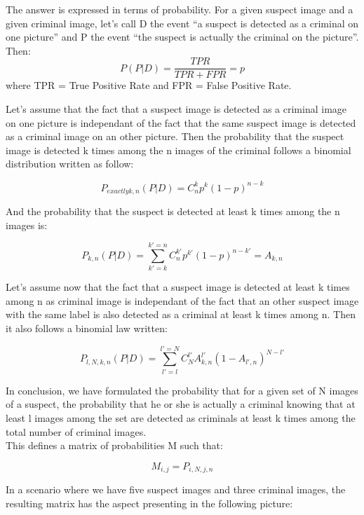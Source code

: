 The answer is expressed in terms of probability.
For a given suspect image and a given criminal image, let's call D the event \enquote{a suspect is detected as a criminal on one picture} and P the event \enquote{the suspect is actually the criminal on the picture}.
Then:\\
\[P(P|D)=\frac{TPR}{TPR+FPR}=p\]
where TPR = True Positive Rate and FPR = False Positive Rate.

Let's assume that the fact that a suspect image is detected as a criminal image on one picture is independant of the fact that the same suspect image is detected as a criminal image on an other picture. Then the probability that the suspect image is detected k times among the n images of the criminal follows a binomial distribution written as follow:

\[P_{exactly k,n}(P|D)=C^{k}_{n}p^k(1-p)^{n-k}\]

And the probability that the suspect is detected at least k times among the n images is:

\[P_{k,n}(P|D)=\sum_{k'=k}^{k'=n} C^{k'}_{n}p^{k'}(1-p)^{n-k'}=A_{k,n}\]

Let's assume now that the fact that a suspect image is detected at least k times among n as criminal image is independant of the fact that an other suspect image with the same label is also detected as a criminal at least k times among n. Then it also follows a binomial law written:

\[P_{l,N,k,n}(P|D)=\sum_{l'=l}^{l'=N} C^{l'}_{N}A_{k,n}^{l'}(1-A_{l',n})^{N-l'}\]

In conclusion, we have formulated the probability that for a given set of N images of a suspect, the probability that he or she is actually a criminal knowing that at least l images among the set are detected as criminals at least k times among the total number of criminal images.\\

This defines a matrix of probabilities M such that:

\[M_{i,j}=P_{i,N,j,n}\]

In a scenario where we have five suspect images and three criminal images, the resulting matrix has the aspect presenting in the following picture:


